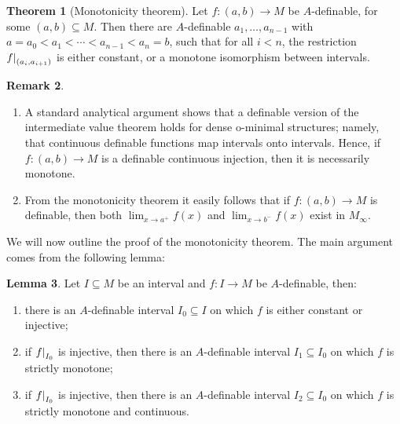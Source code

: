 \documentclass[a4paper]{report}
\newcommand{\ind}{\hspace{15pt}}
\newcommand\restr[2]{{\left.\kern-\nulldelimiterspace#1\right|_{#2}}}
\theoremstyle{definition}
\newtheorem{thm}{Theorem}[chapter]
\newtheorem{lem}[thm]{Lemma}
\theoremstyle{remstyle}
\newtheorem{rem}[thm]{Remark}
\begin{document}
\begin{thm}[Monotonicity theorem]\label{mono}
	Let $f:(a,b)\to M$ be $A$-definable, for some $(a,b)\subseteq M$. Then there are $A$-definable $a_1,\ldots,a_{n-1}$ with $a=a_0<a_1<\cdots<a_{n-1}<a_n=b$, such that for all $i<n$, the restriction $\restr{f}{(a_i,a_{i+1})}$ is either constant, or a monotone isomorphism between intervals.
\end{thm}

\begin{rem}\label{limits}\
	\begin{enumerate}
		\item A standard analytical argument shows that a definable version of the intermediate value theorem holds for dense o-minimal structures; namely, that continuous definable functions map intervals onto intervals. Hence, if $f:(a,b)\to M$ is a definable continuous injection, then it is necessarily monotone.
		\item From the monotonicity theorem it easily follows that if $f:(a,b)\to M$ is definable, then both $\lim_{x\to a^+}f(x)$ and $\lim_{x\to b^-}f(x)$ exist in $M_{\infty}$.
	\end{enumerate}
\end{rem}

\ind We will now outline the proof of the monotonicity theorem. The main argument comes from the following lemma:

\begin{lem}\label{monolem}
	Let $I\subseteq M$ be an interval and $f:I\to M$ be $A$-definable, then:
	\begin{enumerate}
		\item there is an $A$-definable interval $I_0\subseteq I$ on which $f$ is either constant or injective;
		\item if $\restr{f}{I_0}$ is injective, then there is an $A$-definable interval $I_1\subseteq I_0$ on which $f$ is strictly monotone;
		\item if $\restr{f}{I_0}$ is injective, then there is an $A$-definable interval $I_2\subseteq I_0$ on which $f$ is strictly monotone and continuous.
	\end{enumerate}
\end{lem}
\end{document}
